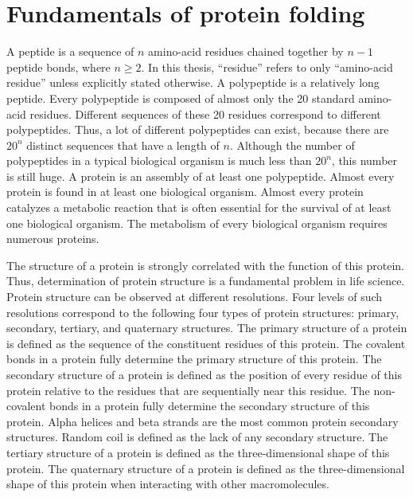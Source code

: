 
\glsunsetall
\chapter{Fundamentals of protein folding}
\label{chap:fund1}
\glsresetall


A peptide is a sequence of \(n\) amino-acid residues chained together by \(n{-}1\) peptide bonds, where \(n{\ge}2\).
In this thesis, ``residue'' refers to only ``amino-acid residue'' unless explicitly stated otherwise.
A polypeptide is a relatively long peptide.	
Every polypeptide is composed of almost only the 20 standard amino-acid residues.{} 
Different sequences of these 20 residues correspond to different polypeptides.
Thus, a lot of different polypeptides can exist, because there are \(20^n\) distinct sequences that have a length of \(n\).
Although the number of polypeptides in a typical biological organism is much less than \(20^n\), this number is still huge.
A protein is an assembly of at least one polypeptide. 
Almost every protein is found in at least one biological organism.
Almost every protein catalyzes a metabolic reaction that is often essential for the survival of at least one biological organism. 
The metabolism of every biological organism requires numerous proteins.

The structure of a protein is strongly correlated with the function of this protein. 
Thus, determination of protein structure is a fundamental problem in life science. 
Protein structure can be observed at different resolutions.
Four levels of such resolutions correspond to the following four types of protein structures: primary, secondary, tertiary, and quaternary structures. 
The primary structure of a protein is defined as the sequence of the constituent residues of this protein.{}
The covalent bonds in a protein fully determine the primary structure of this protein. 
The secondary structure of a protein is defined as the position of every residue of this protein relative to the residues that are sequentially near this residue.
The non-covalent bonds in a protein fully determine the secondary structure of this protein.{}
Alpha helices and beta strands are the most common protein secondary structures.
Random coil is defined as the lack of any secondary structure. 
The tertiary structure of a protein is defined as the three-dimensional shape of this protein.
The quaternary structure of a protein is defined as the three-dimensional shape of this protein when interacting with other macromolecules. 

